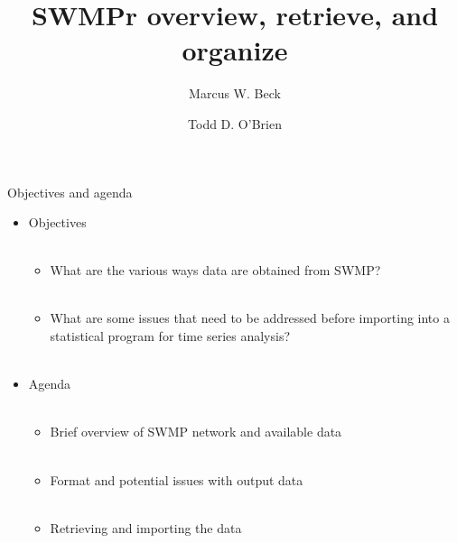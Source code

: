 \documentclass[xcolor=svgnames]{beamer}\usepackage[]{graphicx}\usepackage[]{color}
\begin{document}
\title[SWMPr overview, retrieve, and organize]{SWMPr overview, retrieve, and organize}

\author[M. Beck, T. O'Brien]{Marcus W. Beck \and Todd D. O'Brien}

\date{}







\begin{frame}{Objectives and agenda}
\begin{itemize}
\onslide<+->
\item Objectives \\~\\
\begin{itemize}
\item What are the various ways data are obtained from SWMP? \\~\\
\item What are some issues that need to be addressed before importing into a statistical program for time series analysis? \\~\\
\end{itemize}
\onslide<+->
\item Agenda \\~\\
\begin{itemize}
\item Brief overview of SWMP network and available data \\~\\
\item Format and potential issues with output data \\~\\
\item Retrieving and importing the data \\~\\
\end{itemize}
\end{itemize}
\end{frame}
\end{document}
